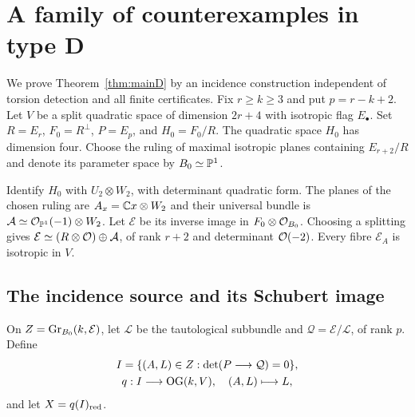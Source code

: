 \section{A family of counterexamples in type D}\label{sec:type-d}

We prove Theorem~\ref{thm:mainD} by an incidence construction independent of torsion detection and all finite certificates. Fix $r\ge k\ge3$ and put $p=r-k+2$. Let $V$ be a split quadratic space of dimension $2r+4$ with isotropic flag $E_\bullet$. Set $R=E_r$, $F_0=R^\perp$, $P=E_p$, and $H_0=F_0/R$. The quadratic space $H_0$ has dimension four. Choose the ruling of maximal isotropic planes containing $E_{r+2}/R$ and denote its parameter space by $B_0\simeq\mathbb P^1$.

Identify $H_0$ with $U_2\otimes W_2$, with determinant quadratic form. The planes of the chosen ruling are $A_x=\mathbb C x\otimes W_2$ and their universal bundle is $\mathcal A\simeq\mathcal O_{\mathbb P^1}(-1)\otimes W_2$. Let $\mathcal E$ be its inverse image in $F_0\otimes\mathcal O_{B_0}$. Choosing a splitting gives $\mathcal E\simeq(R\otimes\mathcal O)\oplus\mathcal A$, of rank $r+2$ and determinant $\mathcal O(-2)$. Every fibre $\mathcal E_A$ is isotropic in $V$.

\subsection{The incidence source and its Schubert image}
On $Z=\operatorname{Gr}_{B_0}(k,\mathcal E)$, let $\mathcal L$ be the tautological subbundle and $\mathcal Q=\mathcal E/\mathcal L$, of rank $p$. Define
\begin{equation}\label{eq:D-incidence}
 \begin{gathered}
 I=\{(A,L)\in Z:\det(P\longrightarrow\mathcal Q)=0\},
 \\ q:I\longrightarrow\operatorname{OG}(k,V),\quad (A,L)\longmapsto L,
 \end{gathered}
\end{equation}
and let $X=q(I)_{\mathrm{red}}$.

